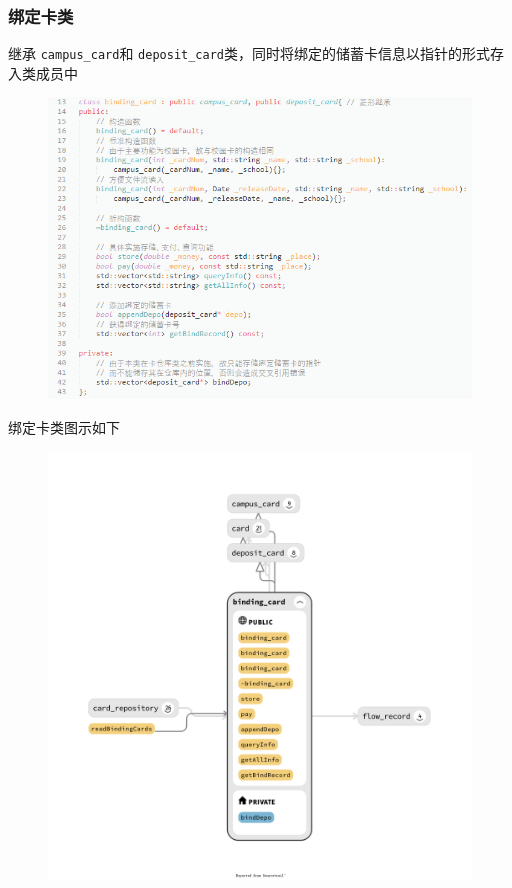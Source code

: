 \documentclass[11pt,UTF8]{ctexart}
\begin{document}
\subsubsection{绑定卡类}
\par 继承 \verb'campus_card'和 \verb'deposit_card'类，同时将绑定的储蓄卡信息以指针的形式存入类成员中
\begin{figure}[H]
\centering
\includegraphics[width=0.9\linewidth]{pic/binding_card.PNG}
\end{figure}
\par 绑定卡类图示如下
\begin{figure}[H]
\centering
\includegraphics[width=0.8\linewidth]{pic/binding_card_class.png}
\end{figure}
\end{document}
